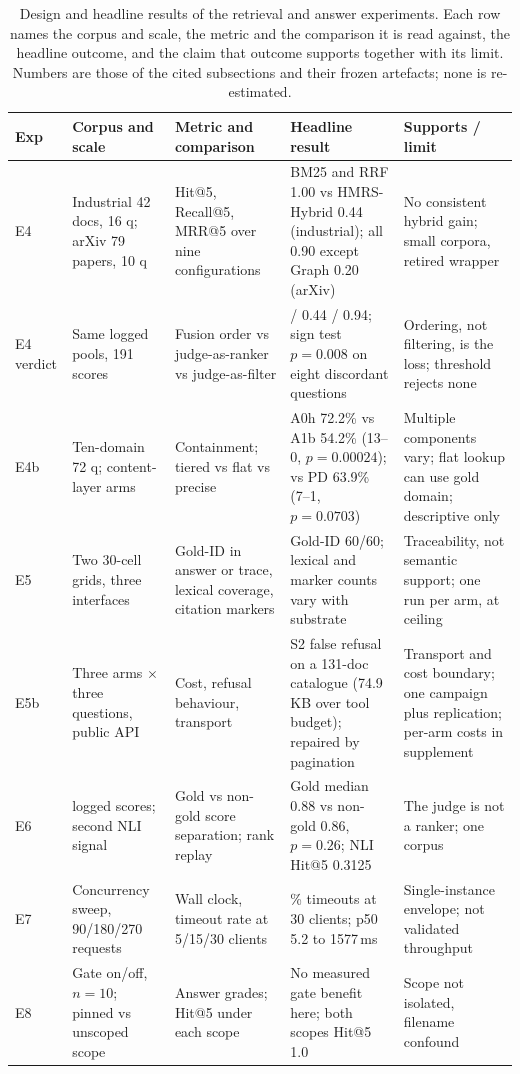 \documentclass[final,5p,times,twocolumn]{elsarticle}
\begin{document}
\begin{table}[t]
\centering
\footnotesize
\setlength{\tabcolsep}{4pt}
\caption{Design and headline results of the retrieval and answer experiments.
Each row names the corpus and scale, the metric and the comparison it is read
against, the headline outcome, and the claim that outcome supports together
with its limit. Numbers are those of the cited subsections and their frozen
artefacts; none is re-estimated.}
\label{tab:retrieval-design}
\begin{tabular}{@{}>{\raggedright\arraybackslash}p{}>{\raggedright\arraybackslash}p{}>{\raggedright\arraybackslash}p{}>{\raggedright\arraybackslash}p{}>{\raggedright\arraybackslash}p{}@{}}
\toprule
Exp & Corpus and scale & Metric and comparison & Headline result & Supports / limit\\
\midrule
E4 & Industrial 42 docs, 16 q; arXiv 79 papers, 10 q & Hit@5, Recall@5, MRR@5 over nine configurations & BM25 and RRF 1.00 vs HMRS-Hybrid 0.44 (industrial); all 0.90 except Graph 0.20 (arXiv) & No consistent hybrid gain; small corpora, retired wrapper\\
E4 verdict & Same logged pools, 191 scores & Fusion order vs judge-as-ranker vs judge-as-filter & 0.94 / 0.44 / 0.94; sign test $p=0.008$ on eight discordant questions & Ordering, not filtering, is the loss; threshold rejects none\\
E4b & Ten-domain 72 q; content-layer arms & Containment; tiered vs flat vs precise & A0h 72.2\% vs A1b 54.2\% (13--0, $p=0.00024$); vs PD 63.9\% (7--1, $p=0.0703$) & Multiple components vary; flat lookup can use gold domain; descriptive only\\
E5 & Two 30-cell grids, three interfaces & Gold-ID in answer or trace, lexical coverage, citation markers & Gold-ID 60/60; lexical and marker counts vary with substrate & Traceability, not semantic support; one run per arm, at ceiling\\
E5b & Three arms $\times$ three questions, public API & Cost, refusal behaviour, transport & S2 false refusal on a 131-doc catalogue (74.9\,KB over tool budget); repaired by pagination & Transport and cost boundary; one campaign plus replication; per-arm costs in supplement\\
E6 & 191 logged scores; second NLI signal & Gold vs non-gold score separation; rank replay & Gold median 0.88 vs non-gold 0.86, $p=0.26$; NLI Hit@5 0.3125 & The judge is not a ranker; one corpus\\
E7 & Concurrency sweep, 90/180/270 requests & Wall clock, timeout rate at 5/15/30 clients & 41\% timeouts at 30 clients; p50 5.2 to 1577\,ms & Single-instance envelope; not validated throughput\\
E8 & Gate on/off, $n=10$; pinned vs unscoped scope & Answer grades; Hit@5 under each scope & No measured gate benefit here; both scopes Hit@5 1.0 & Scope not isolated, filename confound\\
\bottomrule
\end{tabular}
\end{table}
\end{document}
